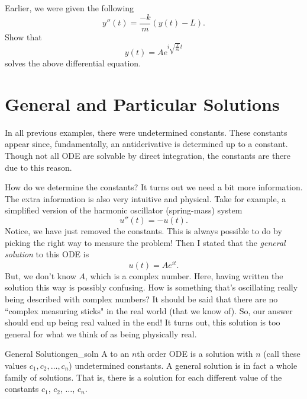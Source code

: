         \begin{exercise} Earlier, we were given the following
        \[
        y''(t) = \frac{-k}{m} (y(t)-L).
        \]
        Show that
        \[
        y(t) = Ae^{i\sqrt{\frac{k}{m}}t}
        \]
        solves the above differential equation.
        \end{exercise}

        \section{General and Particular Solutions}
        In all previous examples, there were undetermined constants.  These constants appear since, fundamentally, an antiderivative is determined up to a constant.  Though not all ODE are solvable by direct integration, the constants are there due to this reason.

        How do we determine the constants?  It turns out we need a bit more information.  The extra information is also very intuitive and physical.  Take for example, a simplified version of the harmonic oscillator (spring-mass) system
        \[
        u''(t) = -u(t).
        \]
        Notice, we have just removed the constants.  This is always possible to do by picking the right way to measure the problem! Then I stated that the \emph{general solution}  to this ODE is
        \[
        u(t)=Ae^{it}.
        \]
        But, we don't know $A$, which is a complex number. Here, having written the solution this way is possibly confusing.  How is something that's oscillating really being described with complex numbers? It should be said that there are no ``complex measuring sticks" in the real world (that we know of).  So, our answer should end up being real valued in the end! It turns out, this solution is too general for what we think of as being physically real.

        \begin{df}{General Solution}{gen_soln}
            A  to an $n$th order ODE is a solution with $n$  (call these values $c_1,c_2,\dots,c_n$) undetermined constants. A general solution is in fact a whole family of solutions. That is, there is a solution for each different value of the constants $c_1$, $c_2$, $\dots$, $c_n$.
        \end{df}


